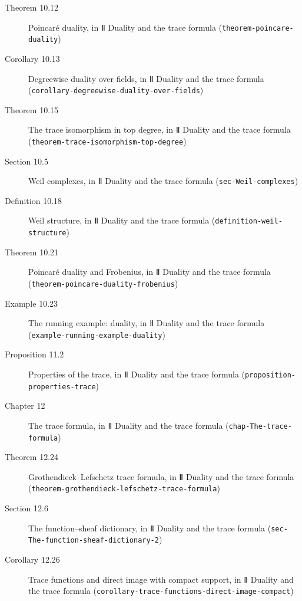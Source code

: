 \documentclass[11pt]{article}
\newcommand{\bpslug}[1]{\texttt{#1}}
\begin{document}
\begin{description}
\item[Theorem 10.12] Poincaré duality, in Ⅱ Duality and the trace formula (\bpslug{theorem-{}\allowbreak{}poincare-{}\allowbreak{}duality})
\item[Corollary 10.13] Degreewise duality over fields, in Ⅱ Duality and the trace formula (\bpslug{corollary-{}\allowbreak{}degreewise-{}\allowbreak{}duality-{}\allowbreak{}over-{}\allowbreak{}fields})
\item[Theorem 10.15] The trace isomorphism in top degree, in Ⅱ Duality and the trace formula (\bpslug{theorem-{}\allowbreak{}trace-{}\allowbreak{}isomorphism-{}\allowbreak{}top-{}\allowbreak{}degree})
\item[Section 10.5] Weil complexes, in Ⅱ Duality and the trace formula (\bpslug{sec-{}\allowbreak{}Weil-{}\allowbreak{}complexes})
\item[Definition 10.18] Weil structure, in Ⅱ Duality and the trace formula (\bpslug{definition-{}\allowbreak{}weil-{}\allowbreak{}structure})
\item[Theorem 10.21] Poincaré duality and Frobenius, in Ⅱ Duality and the trace formula (\bpslug{theorem-{}\allowbreak{}poincare-{}\allowbreak{}duality-{}\allowbreak{}frobenius})
\item[Example 10.23] The running example: duality, in Ⅱ Duality and the trace formula (\bpslug{example-{}\allowbreak{}running-{}\allowbreak{}example-{}\allowbreak{}duality})
\item[Proposition 11.2] Properties of the trace, in Ⅱ Duality and the trace formula (\bpslug{proposition-{}\allowbreak{}properties-{}\allowbreak{}trace})
\item[Chapter 12] The trace formula, in Ⅱ Duality and the trace formula (\bpslug{chap-{}\allowbreak{}The-{}\allowbreak{}trace-{}\allowbreak{}formula})
\item[Theorem 12.24] Grothendieck–Lefschetz trace formula, in Ⅱ Duality and the trace formula (\bpslug{theorem-{}\allowbreak{}grothendieck-{}\allowbreak{}lefschetz-{}\allowbreak{}trace-{}\allowbreak{}formula})
\item[Section 12.6] The function–sheaf dictionary, in Ⅱ Duality and the trace formula (\bpslug{sec-{}\allowbreak{}The-{}\allowbreak{}function-{}\allowbreak{}sheaf-{}\allowbreak{}dictionary-{}\allowbreak{}2})
\item[Corollary 12.26] Trace functions and direct image with compact support, in Ⅱ Duality and the trace formula (\bpslug{corollary-{}\allowbreak{}trace-{}\allowbreak{}functions-{}\allowbreak{}direct-{}\allowbreak{}image-{}\allowbreak{}compact})

\end{description}
\end{document}
